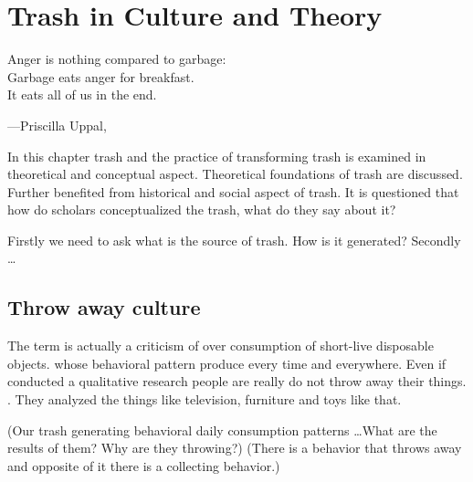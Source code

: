\chapter{Trash in Culture and Theory}

\epigraph{Anger is nothing compared to garbage:\\ Garbage eats anger for breakfast.\\ It eats all of us in the end.}{\hfill---Priscilla Uppal, }

In this chapter trash and the practice of transforming trash is examined in theoretical and conceptual aspect. Theoretical foundations of trash are discussed. Further benefited from historical and social aspect of trash. It is questioned that how do scholars conceptualized the trash, what do they say about it? 

Firstly we need to ask what is the source of trash. How is it generated? Secondly \ldots

\section{Throw away culture}
The term is actually a criticism of over consumption of short-live disposable objects.
 whose behavioral pattern produce every time and everywhere. Even if conducted a qualitative research people are really do not throw away their things. . They analyzed the things like television, furniture and toys like that.


(Our trash generating behavioral daily consumption patterns \ldots What are the results of them? Why are they throwing?) (There is a behavior that throws away and opposite of it there is a collecting behavior.)

